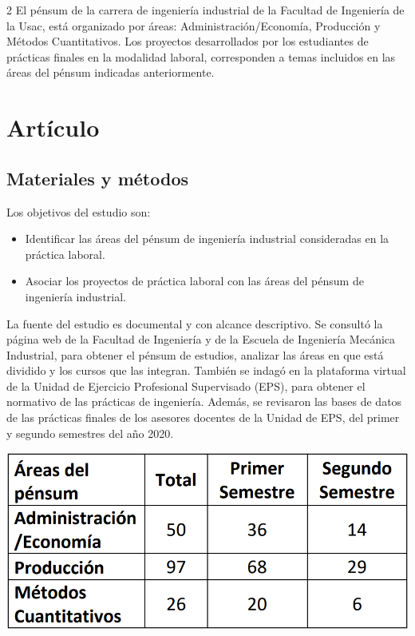 \documentclass[12pt,spanish,Letterpaper,openany]{book}
\begin{document}
\begin {multicols}{2}
El pénsum de la carrera de ingeniería industrial de la Facultad de Ingeniería de la Usac, está organizado por áreas: Administración/Economía, Producción y Métodos Cuantitativos. Los proyectos desarrollados por los estudiantes de prácticas finales en la modalidad laboral, corresponden a temas incluidos en las áreas del pénsum indicadas anteriormente.

\hypertarget{artuxedculo}{%
\section{Artículo}\label{artuxedculo}}

\hypertarget{materiales-y-muxe9todos}{%
\subsection{Materiales y métodos}\label{materiales-y-muxe9todos}}

Los objetivos del estudio son:

\begin{itemize}
\item
  Identificar las áreas del pénsum de ingeniería industrial consideradas en la práctica laboral.
\item
  Asociar los proyectos de práctica laboral con las áreas del pénsum de ingeniería industrial.
\end{itemize}

La fuente del estudio es documental y con alcance descriptivo. Se consultó la página web de la Facultad de Ingeniería y de la Escuela de Ingeniería Mecánica Industrial, para obtener el pénsum de estudios, analizar las áreas en que está dividido y los cursos que las integran. También se indagó en la plataforma virtual de la Unidad de Ejercicio Profesional Supervisado (EPS), para obtener el normativo de las prácticas de ingeniería. Además, se revisaron las bases de datos de las prácticas finales de los asesores docentes de la Unidad de EPS, del primer y segundo semestres del año 2020.

\begin {center}

\noindent\begin{minipage}[c]{\columnwidth}

\begin{center}\includegraphics[width=1\linewidth]{images/02_03} \end{center}
\vspace{0.01cm}
\centering
\footnotesize


\end{minipage}
\end{center}
\end{multicols}
\end{document}
